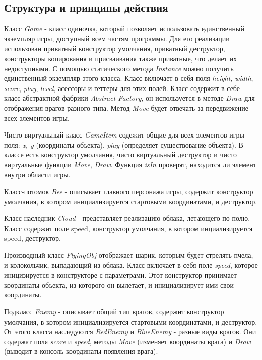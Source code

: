 \documentclass[a4paper,14pt]{article}
\begin{document}
\subsection{Структура и принципы действия}
Класс \textit{Game} - класс одиночка, который позволяет использовать единственный экземпляр игры, доступный всем частям программы. Для его реализации использован приватный конструктор умолчания, приватный деструктор, конструкторы копирования и присваивания также приватные, что делает их недоступными. С помощью статического метода \textit{Instance} можно получить единственный экземпляр этого класса. Класс включает в себя поля \textit{height}, \textit{width}, \textit{score}, \textit{play}, \textit{level}, асессоры и геттеры для этих полей. Класс содержит в себе класс абстрактной фабрики \textit{Abstract Factory}, он используется в методе \textit{Draw} для отображения врагов разного типа. Метод \textit{Move} будет отвечать за передвижение всех элементов игры.

Чисто виртуальный класс \textit{GameItem} содежит общие для всех элементов игры поля: \textit{x, y} (координаты объекта), \textit{play} (определяет существование объекта). В классе есть конструктор умолчания, чисто виртуальный деструктор и чисто виртуальные функции \textit{Move}, \textit{Draw}. Функция \textit{isIn} проверят, находится ли элемент внутри области игры.

Класс-потомок \textit{Bee} - описывает главного персонажа игры, содержит конструктор умолчания, в котором инициализируется стартовыми координатами, и деструктор.

Класс-наследник \textit{Cloud} - представляет реализацию облака, летающего по полю. Класс содержит поле speed, конструктор умолчания, в котором инциализируется speed, деструктор.

Производный класс \textit{FlyingObj} отображает шарик, которым будет стрелять пчела, и колокольчик, выпадающий из облака. Класс включает в себя поле \textit{speed}, которое иницизируется в конструкторе с параметрами. Этот конструктор принимает координаты объекта, из которого он вылетает, и инициализирует ими свои координаты.

Подкласс \textit{Enemy} - описывает общий тип врагов, содержит конструктор умолчания, в котором инициализируется стартовыми координатами, и деструктор. От этого класса наследуются \textit{RedEnemy} и \textit{BlueEnemy} - разные виды врагов. Они содержат поля \textit{score} и \textit{speed}, методы \textit{Move} (изменяет координаты врага) и \textit{Draw} (выводит в консоль координаты появления врага).
\end{document}
